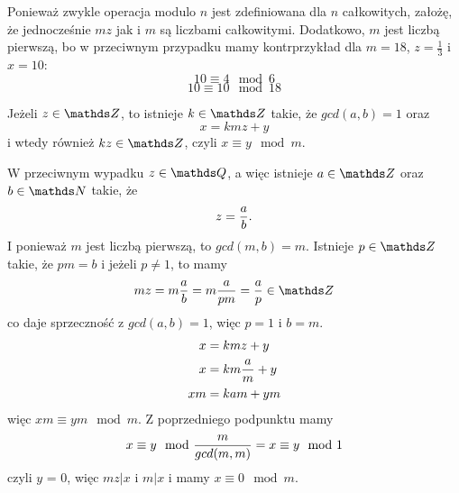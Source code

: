 \documentclass{article}[13pt]
\begin{document}
Ponieważ zwykle operacja modulo $n$ jest zdefiniowana dla $n$ całkowitych, założę, że jednocześnie $mz$ jak i $m$ są liczbami całkowitymi. Dodatkowo, $m$ jest liczbą pierwszą, bo w przeciwnym przypadku mamy kontrprzykład dla $m=18$, $z=\frac13$ i $x=10$:
$$10\equiv 4\mod 6$$
$$10\equiv 10\mod 18$$
\smallskip

Jeżeli $z\in\Z$, to istnieje $k\in\Z$ takie, że $gcd(a,b)=1$ oraz
$$x=kmz+y$$
i wtedy również $kz\in\Z$, czyli $x\equiv y\mod m$.
\smallskip

W przeciwnym wypadku $z\in\Q$, a więc istnieje $a\in\Z$ oraz $b\in\N$ takie, że
$$z={a\over b}.$$
I ponieważ $m$ jest liczbą pierwszą, to $gcd(m,b)=m$. Istnieje $p\in\Z$ takie, że $pm=b$ i jeżeli $p\neq 1$, to mamy
$$mz=m{a\over b}=m{a\over pm}={a\over p}\in\Z$$
co daje sprzeczność z $gcd(a,b)=1$, więc $p=1$ i $b=m$.
\begin{align*}
    x&=kmz+y\\
    x&=km{a\over m}+y\\
    xm&=kam+ym
\end{align*}
więc $xm\equiv ym\mod m$. Z poprzedniego podpunktu mamy
$$x\equiv y\mod {{m\over gcd(m,m)}}=x\equiv y\mod 1$$
czyli $y$ = 0, więc $mz|x$ i $m|x$ i mamy $x\equiv 0\mod m$.
\end{document}
